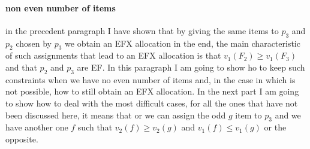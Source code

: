 \paragraph{non even number of items} in the precedent paragraph I have shown that by giving the same items to $p_3$ and $p_2$ chosen by $p_3$ we obtain an EFX allocation in the end, the main characteristic of such assignments that lead to an EFX allocation is that $v_1(F_2) \ge v_1(F_3)$ and that $p_2$ and $p_3$ are EF. In this paragraph I am going to show ho to keep such constraints when we have no even number of items and, in the case in which is not possible, how to still obtain an EFX allocation. In the next part I am going to show how to deal with the most difficult cases, for all the ones that have not been discussed here, it means that or we can assign the odd $g$ item to $p_3$ and we have another one $f$ such that $v_2(f)\ge v_2(g)$ and $v_1(f) \le v_1(g)$ or the opposite.
